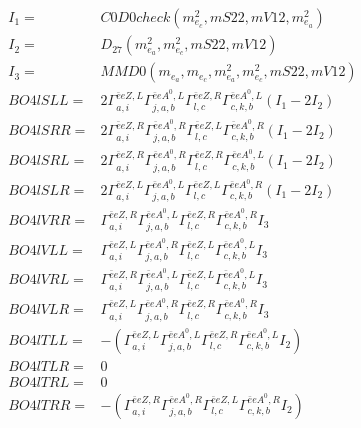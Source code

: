 \documentclass[A4,landscape]{article}
\begin{document}
\begin{align} 
I_1 = & C0D0check(m^2_{e_{{c}}}, mS22, mV12, m^2_{e_{{a}}}) \\ 
I_2 = & D_{27}(m^2_{e_{{a}}}, m^2_{e_{{c}}}, mS22, mV12) \\ 
I_3 = & MMD0(m_{e_{{a}}}, m_{e_{{c}}}, m^2_{e_{{a}}}, m^2_{e_{{c}}}, mS22, mV12) \\ 
  BO4lSLL= & 2  \Gamma^{\bar{e}e Z ,L}_{a, i} \Gamma^{\bar{e}e A^0 ,L}_{j, a, b} \Gamma^{\bar{e}e Z ,R}_{l, c} \Gamma^{\bar{e}e A^0 ,L}_{c, k, b} (I_1 - 2 I_2) \\ 
  BO4lSRR= & 2  \Gamma^{\bar{e}e Z ,R}_{a, i} \Gamma^{\bar{e}e A^0 ,R}_{j, a, b} \Gamma^{\bar{e}e Z ,L}_{l, c} \Gamma^{\bar{e}e A^0 ,R}_{c, k, b} (I_1 - 2 I_2) \\ 
  BO4lSRL= & 2  \Gamma^{\bar{e}e Z ,R}_{a, i} \Gamma^{\bar{e}e A^0 ,R}_{j, a, b} \Gamma^{\bar{e}e Z ,R}_{l, c} \Gamma^{\bar{e}e A^0 ,L}_{c, k, b} (I_1 - 2 I_2) \\ 
  BO4lSLR= & 2  \Gamma^{\bar{e}e Z ,L}_{a, i} \Gamma^{\bar{e}e A^0 ,L}_{j, a, b} \Gamma^{\bar{e}e Z ,L}_{l, c} \Gamma^{\bar{e}e A^0 ,R}_{c, k, b} (I_1 - 2 I_2) \\ 
  BO4lVRR= &  \Gamma^{\bar{e}e Z ,R}_{a, i} \Gamma^{\bar{e}e A^0 ,L}_{j, a, b} \Gamma^{\bar{e}e Z ,R}_{l, c} \Gamma^{\bar{e}e A^0 ,R}_{c, k, b} I_3 \\ 
  BO4lVLL= &  \Gamma^{\bar{e}e Z ,L}_{a, i} \Gamma^{\bar{e}e A^0 ,R}_{j, a, b} \Gamma^{\bar{e}e Z ,L}_{l, c} \Gamma^{\bar{e}e A^0 ,L}_{c, k, b} I_3 \\ 
  BO4lVRL= &  \Gamma^{\bar{e}e Z ,R}_{a, i} \Gamma^{\bar{e}e A^0 ,L}_{j, a, b} \Gamma^{\bar{e}e Z ,L}_{l, c} \Gamma^{\bar{e}e A^0 ,L}_{c, k, b} I_3 \\ 
  BO4lVLR= &  \Gamma^{\bar{e}e Z ,L}_{a, i} \Gamma^{\bar{e}e A^0 ,R}_{j, a, b} \Gamma^{\bar{e}e Z ,R}_{l, c} \Gamma^{\bar{e}e A^0 ,R}_{c, k, b} I_3 \\ 
  BO4lTLL= & -( \Gamma^{\bar{e}e Z ,L}_{a, i} \Gamma^{\bar{e}e A^0 ,L}_{j, a, b} \Gamma^{\bar{e}e Z ,R}_{l, c} \Gamma^{\bar{e}e A^0 ,L}_{c, k, b} I_2) \\ 
  BO4lTLR= & 0 \\ 
  BO4lTRL= & 0 \\ 
  BO4lTRR= & -( \Gamma^{\bar{e}e Z ,R}_{a, i} \Gamma^{\bar{e}e A^0 ,R}_{j, a, b} \Gamma^{\bar{e}e Z ,L}_{l, c} \Gamma^{\bar{e}e A^0 ,R}_{c, k, b} I_2) \\ 
\end{align} 
\end{document}
